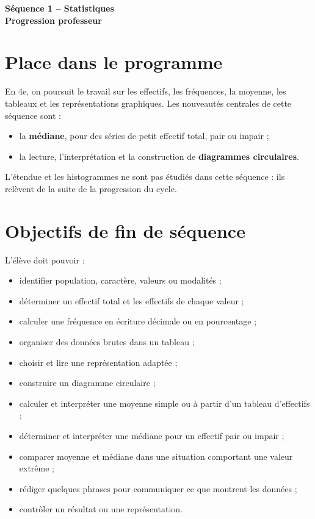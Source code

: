 \documentclass[12pt,a4paper]{article}
\newcommand{\titreseq}[1]{%
\begin{center}
  {\sffamily\LARGE\bfseries\color{TitreC}
  Séquence 1 -- Statistiques}\\[0.2em]
  {\sffamily\large\bfseries\color{SavoirC}#1}
\end{center}
}
\begin{document}
\titreseq{Progression professeur}


\section*{Place dans le programme}

En 4e, on poursuit le travail sur les effectifs, les fréquences,
la moyenne, les tableaux et les représentations graphiques.
Les nouveautés centrales de cette séquence sont :

\begin{itemize}
  \item la \textbf{médiane}, pour des séries de petit effectif total,
        pair ou impair ;
  \item la lecture, l'interprétation et la construction de
        \textbf{diagrammes circulaires}.
\end{itemize}

L'étendue et les histogrammes ne sont pas étudiés dans cette séquence :
ils relèvent de la suite de la progression du cycle.

\section*{Objectifs de fin de séquence}

L'élève doit pouvoir :

\begin{itemize}
  \item identifier population, caractère, valeurs ou modalités ;
  \item déterminer un effectif total et les effectifs de chaque valeur ;
  \item calculer une fréquence en écriture décimale ou en pourcentage ;
  \item organiser des données brutes dans un tableau ;
  \item choisir et lire une représentation adaptée ;
  \item construire un diagramme circulaire ;
  \item calculer et interpréter une moyenne simple ou à partir d'un tableau d'effectifs ;
  \item déterminer et interpréter une médiane pour un effectif pair ou impair ;
  \item comparer moyenne et médiane dans une situation comportant une valeur extrême ;
  \item rédiger quelques phrases pour communiquer ce que montrent les données ;
  \item contrôler un résultat ou une représentation.
\end{itemize}
\end{document}
